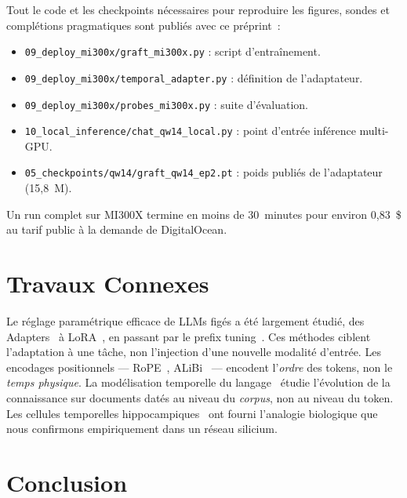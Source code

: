 \documentclass[10pt,twocolumn,letterpaper]{article}
\begin{document}
Tout le code et les checkpoints nécessaires pour reproduire les figures, sondes et complétions pragmatiques sont publiés avec ce préprint~:

\begin{itemize}[leftmargin=0.6cm, itemsep=1pt]
    \item \texttt{09\_deploy\_mi300x/graft\_mi300x.py} : script d'entraînement.
    \item \texttt{09\_deploy\_mi300x/temporal\_adapter.py} : définition de l'adaptateur.
    \item \texttt{09\_deploy\_mi300x/probes\_mi300x.py} : suite d'évaluation.
    \item \texttt{10\_local\_inference/chat\_qw14\_local.py} : point d'entrée inférence multi-GPU.
    \item \texttt{05\_checkpoints/qw14/graft\_qw14\_ep2.pt} : poids publiés de l'adaptateur (15{,}8~M).
\end{itemize}

Un run complet sur MI300X termine en moins de 30~minutes pour environ 0{,}83~\$ au tarif public à la demande de DigitalOcean.

\section{Travaux Connexes}

Le réglage paramétrique efficace de LLMs figés a été largement étudié, des Adapters~\cite{howard2013} à LoRA~\cite{hu2021lora}, en passant par le prefix tuning~\cite{li2021prefix}. Ces méthodes ciblent l'adaptation à une tâche, non l'injection d'une nouvelle modalité d'entrée. Les encodages positionnels --- RoPE~\cite{su2021rope}, ALiBi~\cite{press2021alibi} --- encodent l'\emph{ordre} des tokens, non le \emph{temps physique}. La modélisation temporelle du langage~\cite{dhingra2021,wang2023} étudie l'évolution de la connaissance sur documents datés au niveau du \emph{corpus}, non au niveau du token. Les cellules temporelles hippocampiques~\cite{macdonald2011} ont fourni l'analogie biologique que nous confirmons empiriquement dans un réseau silicium.

\section{Conclusion}
\end{document}
